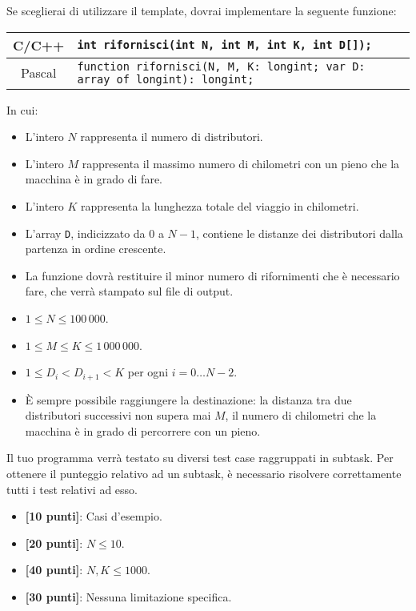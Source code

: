 Se sceglierai di utilizzare il template, dovrai implementare la seguente funzione:
\begin{center}\begin{tabularx}{\textwidth}{|c|X|}
\hline
C/C++  & \verb|int rifornisci(int N, int M, int K, int D[]);|\\
\hline
Pascal & \verb|function rifornisci(N, M, K: longint; var D: array of longint): longint;|\\
\hline
\end{tabularx}\end{center}
In cui:
\begin{itemize}[nolistsep]
  \item L'intero $N$ rappresenta il numero di distributori.
  \item L'intero $M$ rappresenta il massimo numero di chilometri con un pieno che la macchina è in grado di fare.
  \item L'intero $K$ rappresenta la lunghezza totale del viaggio in chilometri.
  \item L'array \texttt{D}, indicizzato da $0$ a $N-1$, contiene le distanze dei distributori dalla partenza in ordine crescente.
  \item La funzione dovrà restituire il minor numero di rifornimenti che è necessario fare, che verrà stampato sul file di output.
\end{itemize}

\pagebreak
\Constraints
\begin{itemize}[nolistsep, itemsep=2mm]
\item $1 \le N \le 100\,000$.
\item $1 \le M \le K \le 1\,000\,000$.
\item $1 \le D_i < D_{i+1} < K$ per ogni $i=0\ldots N-2$.
\item È sempre possibile raggiungere la destinazione: la distanza tra due distributori successivi non supera mai $M$, il numero di chilometri che la macchina è in grado di percorrere con un pieno.
\end{itemize}

\Scoring
Il tuo programma verrà testato su diversi test case raggruppati in subtask.
Per ottenere il punteggio relativo ad un subtask, è necessario risolvere
correttamente tutti i test relativi ad esso.

\begin{itemize}[nolistsep,itemsep=2mm]
  \item \textbf{ [10 punti]}: Casi d'esempio.
  \item \textbf{ [20 punti]}: $N \leq 10$.
  \item \textbf{ [40 punti]}: $N, K \leq 1000$.
  \item \textbf{ [30 punti]}: Nessuna limitazione specifica.
\end{itemize}

